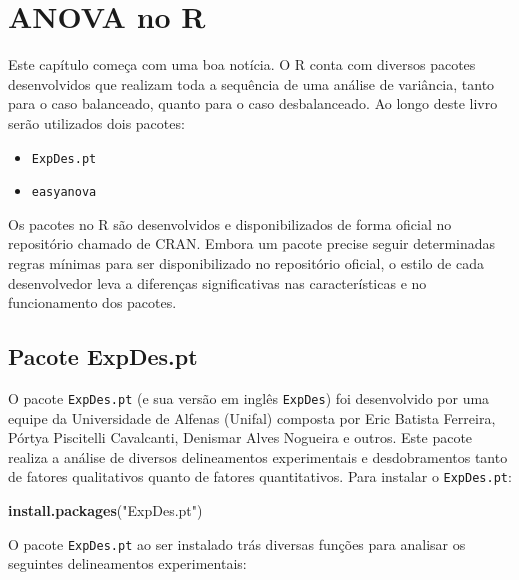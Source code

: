 \documentclass[
]{article}
\newenvironment{Shaded}{\begin{snugshade}}{\end{snugshade}}
\newcommand{\KeywordTok}[1]{\textcolor[rgb]{0.13,0.29,0.53}{\textbf{#1}}}
\newcommand{\NormalTok}[1]{#1}
\newcommand{\StringTok}[1]{\textcolor[rgb]{0.31,0.60,0.02}{#1}}
\providecommand{\tightlist}{%
  \setlength{\itemsep}{0pt}\setlength{\parskip}{0pt}}
\begin{document}
\hypertarget{anova-no-r}{%
\section{ANOVA no R}\label{anova-no-r}}

Este capítulo começa com uma boa notícia. O R conta com diversos pacotes desenvolvidos que realizam toda a sequência de uma análise de variância, tanto para o caso balanceado, quanto para o caso desbalanceado. Ao longo deste livro serão utilizados dois pacotes:

\begin{itemize}
\tightlist
\item
  \texttt{ExpDes.pt}
\item
  \texttt{easyanova}
\end{itemize}

Os pacotes no R são desenvolvidos e disponibilizados de forma oficial no repositório chamado de CRAN. Embora um pacote precise seguir determinadas regras mínimas para ser disponibilizado no repositório oficial, o estilo de cada desenvolvedor leva a diferenças significativas nas características e no funcionamento dos pacotes.

\hypertarget{pacote-expdes.pt}{%
\subsection{Pacote ExpDes.pt}\label{pacote-expdes.pt}}

O pacote \texttt{ExpDes.pt} (e sua versão em inglês \texttt{ExpDes}) foi desenvolvido por uma equipe da Universidade de Alfenas (Unifal) composta por Eric Batista Ferreira, Pórtya Piscitelli Cavalcanti, Denismar Alves Nogueira e outros. Este pacote realiza a análise de diversos delineamentos experimentais e desdobramentos tanto de fatores qualitativos quanto de fatores quantitativos. Para instalar o \texttt{ExpDes.pt}:

\begin{Shaded}
\begin{Highlighting}[]
\KeywordTok{install.packages}\NormalTok{(}\StringTok{"ExpDes.pt"}\NormalTok{)}
\end{Highlighting}
\end{Shaded}

O pacote \texttt{ExpDes.pt} ao ser instalado trás diversas funções para analisar os seguintes delineamentos experimentais:
\end{document}

